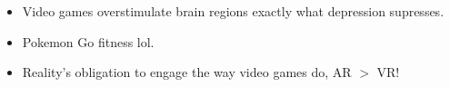 \documentclass[xcolor=dvipsnames, 9pt]{beamer}
\begin{document}
\begin{frame}
\begin{columns}
\begin{column}{0.5\textwidth}
\begin{itemize}
\begin{itemize}
{                            depression.''}
                        \item Video games overstimulate brain regions exactly
                            what depression supresses.
                        \item Pokemon Go fitness lol.
                        \item Reality's obligation to engage the way video games
                            do, AR $>$ VR!%
                    \end{itemize}
            \end{itemize}
        \end{column}
    \end{columns}

\end{frame}
\end{document}
